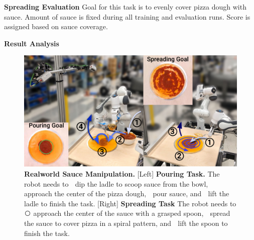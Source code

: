 \textbf{Spreading Evaluation}
Goal for this task is to evenly cover pizza dough with sauce. Amount of sauce is fixed during all training and evaluation runs. Score is assigned based on sauce coverage. 


\textbf{Result Analysis}




\begin{figure}[t]
\centering
\includegraphics[width=\linewidth]{figure/real_sauce_setup.pdf}

\vspace{2mm}

\caption{\textbf{Realworld Sauce Manipulation. } 
[Left] \textbf{Pouring Task.} The robot needs to \textcircled{} dip the ladle to scoop sauce from the bowl, \textcircled{} approach the center of the pizza dough, \textcircled{} pour sauce, and \textcircled{} lift the ladle to finish the task.
[Right] \textbf{Spreading Task} The robot needs to \textcircled{} approach the center of the sauce with a grasped spoon, \textcircled{} spread the sauce to cover pizza in a spiral pattern, and \textcircled{} lift the spoon to finish the task.
}
\end{figure}







